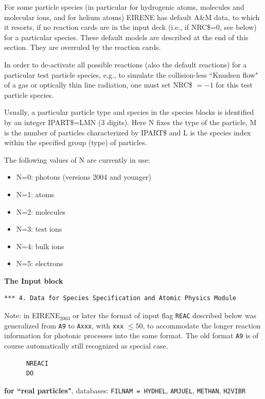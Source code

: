 For some particle species (in particular for hydrogenic atoms, molecules and
molecular ions, and for helium atoms) EIRENE has default A\&M data, to which it
resorts, if no reaction cards are in the input deck (i.e., if NRC\$=0, see
below) for a particular species.
These default models are described at the end of this section.
They are overruled by the reaction cards.

In order to de-activate all possible reactions (also the default reactions) for
a particular test particle species, e.g., to simulate the collision-less
``Knudsen flow" of a gas or optically thin line radiation, one must set NRC\$
$=-1$ for this test particle species.

\medskip

Usually, a particular particle type and species in the species blocks is
identified by an integer IPART\$=LMN (3 digits).
Here N fixes the type of the particle, M is the number of particles
characterized by IPART\$ and L is the species index within the specified group
(type) of particles.

The following values of N are currently in use:
\begin{itemize}
  \item N=0: photons (versions 2004 and younger)
  \item N=1: atoms
  \item N=2:
        molecules
  \item N=3: test ions
  \item N=4: bulk ions
  \item N=5: electrons
\end{itemize}

\textbf{The Input block}

\begin{lstlisting}
*** 4. Data for Species Specification and Atomic Physics Module
\end{lstlisting}

Note: in EIRENE$_{2003}$ or later the format of input flag
\lstinline|REAC| described below was generalized from
\lstinline|A9|  to \lstinline|Axxx|, with
\lstinline|xxx| $\leq 50$,  to accommodate the longer reaction
information for photonic processes into the same format.
The old format \lstinline|A9| is of course automatically still
recognized as special case.

\begin{lstlisting}
      NREACI
      DO
\end{lstlisting}

\textbf{for ``real particles"}, databases: \lstinline|FILNAM = HYDHEL|,
\lstinline|AMJUEL|, \lstinline|METHAN|, \lstinline|H2VIBR|

